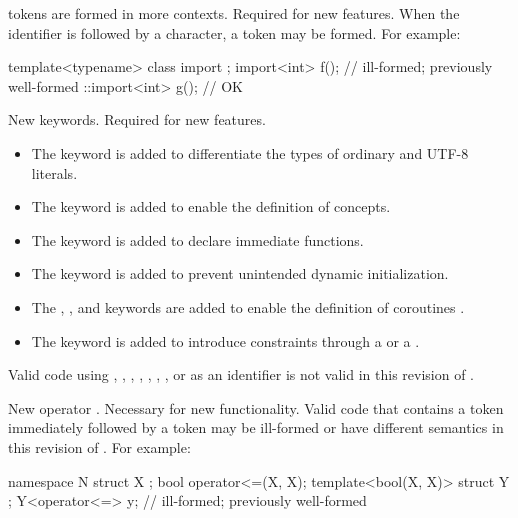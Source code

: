 \change
{} tokens are formed in more contexts.
\rationale
Required for new features.
\effect
When the identifier 
is followed by a \tcode{<} character,
a  token may be formed.
For example:
\begin{codeblock}
template<typename> class import {};
import<int> f();                // ill-formed; previously well-formed
::import<int> g();              // OK
\end{codeblock}

\change
New keywords.
\rationale
Required for new features.
\begin{itemize}
\item
{}%
The  keyword is added to differentiate
the types of ordinary and UTF-8 literals.
\item
The  keyword is
added to enable the definition of concepts.
\item
The  keyword is added to
declare immediate functions.
\item
The  keyword is added to
prevent unintended dynamic initialization.
\item
The , , and  keywords are added
to enable the definition of coroutines .
\item
The  keyword is added
to introduce constraints through a 
or a .
\end{itemize}
\effectafteritemize
Valid \CppXVII{} code using
,
,
,
,
, , ,
or 
as an identifier is not valid in this revision of \Cpp{}.

\change
New operator \tcode{<=>}.
\rationale
Necessary for new functionality.
\effect
Valid \CppXVII{} code that contains a \tcode{<=} token
immediately followed by a \tcode{>} token
may be ill-formed or have different semantics in this revision of \Cpp{}.
For example:
\begin{codeblock}
namespace N {
  struct X {};
  bool operator<=(X, X);
  template<bool(X, X)> struct Y {};
  Y<operator<=> y;              // ill-formed; previously well-formed
}
\end{codeblock}

